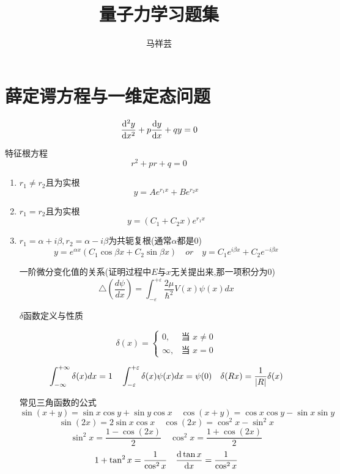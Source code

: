 \documentclass{article}
\title{量子力学习题集}
\author{马祥芸}
\begin{document}
    \maketitle
    \tableofcontents
    \newpage

    \section{薛定谔方程与一维定态问题}

        \begin{formal}
            $$ \dv[2]{y}{x} + p\dv{y}{x} + qy = 0 $$
            
            特征根方程
            $$ r^{2} + pr + q = 0 $$

            \begin{enumerate}
                \item $r_{1} \neq r_{2}$且为实根
                $$ y = Ae^{r_{1}x} + Be^{r_{2}x} $$
                \item $r_{1} = r_{2}$且为实根
                $$ y = (C_{1}+C_{2}x)e^{r_{1}x} $$
                \item $r_{1}=\alpha + i \beta,r_{2} = \alpha - i \beta $为共轭复根(通常$\alpha$都是0)
                $$ y = e^{\alpha x} (C_{1}\cos{\beta x} + C_{2}\sin{\beta x}) \quad or \quad y = C_{1}e^{i\beta x} + C_{2}e^{-i\beta x}$$

                一阶微分变化值的关系(证明过程中$E$与$x$无关提出来,那一项积分为0)
                $$ \triangle(\frac{d\psi}{dx}) = \int_{-\varepsilon}^{+\varepsilon}\frac{2\mu}{\hbar^2}V(x)\psi(x)dx $$    

                $\delta$函数定义与性质

                $$
                \delta(x) = 
                    \begin{cases}
                        0, & \text{当 } x \neq 0 \\
                        \infty, & \text{当 } x = 0
                    \end{cases}
                $$
                    
                $$
                \int_{-\infty}^{+\infty} \delta(x) dx =1
                \quad
                \int_{-\varepsilon}^{+\varepsilon} \delta(x) \psi(x) dx =\psi(0) 
                \quad 
                \delta(Rx) = \frac{1}{\abs{R}} \delta(x) 
                $$

                常见三角函数的公式
                $$\sin(x+y)=\sin{x} \cos{y}+\sin{y}\cos{x} \quad \cos(x+y)=\cos{x} \cos{y} - \sin{x}\sin{y}$$ 
                $$\sin(2x) = 2\sin{x} \cos{x} \quad \cos(2x) = \cos^{2}{x} - \sin^{2}{x} $$
                $$\sin^{2}{x}=\frac{1-\cos(2x)}{2} \quad \cos^{2}{x}=\frac{1+\cos(2x)}{2} $$
                $$ 1 + \tan^{2}{x} = \frac{1}{\cos^{2}{x}} \quad \dv{\tan{x}}{x} = \frac{1}{\cos^{2}{x}} $$


\end{enumerate}
\end{formal}
\end{document}
